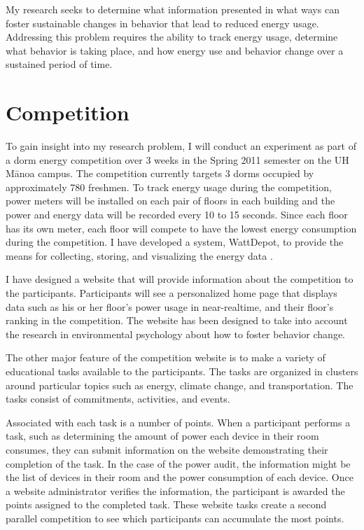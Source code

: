 \documentclass{chi-ext}
\begin{document}
\begin{multicols}{2}
My research seeks to determine what information presented in what ways can foster sustainable changes in behavior that lead to reduced energy usage. Addressing this problem requires the ability to track energy usage, determine what behavior is taking place, and how energy use and behavior change over a sustained period of time.

\section{Competition}

To gain insight into my research problem, I will conduct an experiment as part of a dorm energy competition over 3 weeks in the Spring 2011 semester on the UH M\=anoa campus. The competition currently targets 3 dorms occupied by approximately 780 freshmen. To track energy usage during the competition, power meters will be installed on each pair of floors in each building and the power and energy data will be recorded every 10 to 15 seconds. Since each floor has its own meter, each floor will compete to have the lowest energy consumption during the competition. I have developed a system, WattDepot, to provide the means for collecting, storing, and visualizing the energy data \cite{csdl2-10-05}.

I have designed a website that will provide information about the competition to the participants. Participants will see a personalized home page that displays data such as his or her floor's power usage in near-realtime, and their floor's ranking in the competition. The website has been designed to take into account the research in environmental psychology about how to foster behavior change.

The other major feature of the competition website is to make a variety of educational tasks available to the participants. The tasks are organized in clusters around particular topics such as energy, climate change, and transportation. The tasks consist of commitments, activities, and events.

Associated with each task is a number of points. When a participant performs a task, such as determining the amount of power each device in their room consumes, they can submit information on the website demonstrating their completion of the task. In the case of the power audit, the information might be the list of devices in their room and the power consumption of each device. Once a website administrator verifies the information, the participant is awarded the points assigned to the completed task. These website tasks create a second parallel competition to see which participants can accumulate the most points.


\end{multicols}
\end{document}
